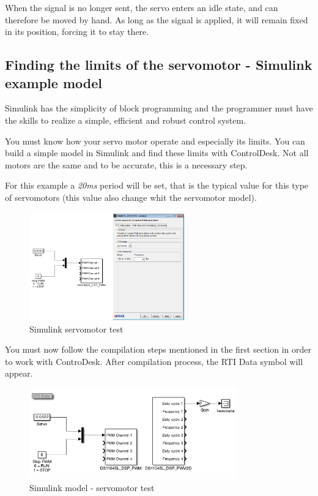 When the signal is no longer sent, the servo enters an idle state, and can therefore be moved by hand. As long as the signal is applied, it will remain fixed in its position, forcing it to stay there.

\subsection{Finding the limits of the servomotor - Simulink example model}

Simulink has the simplicity of block programming and the programmer must have the skills to realize a simple, efficient and robust control system.

You must know how your servo motor operate and especially its limits. You can build a simple model in Simulink and find these limits with ControlDesk. Not all motors are the same and to be accurate, this is a necessary step.

For this example a \textit{20ms} period will be set, that is the typical value for this type of servomotors (this value also change whit the servomotor model).
    \begin{figure}[H]
        \centering
        \includegraphics[width=0.6\textwidth]{Images/Ball and Bean/PWM_Example.png}
        \caption{Simulink servomotor test}
        \label{fig22}
    \end{figure}
You must now follow the compilation steps mentioned in the first section in order to work with ControDesk. After compilation process, the RTI Data symbol will appear.
       
     \begin{figure}[H]
        \centering
        \includegraphics[width=0.8\textwidth]{Images/Ball and Bean/PWMExampleSimulink.png}
        \caption{Simulink model - servomotor test}
        \label{fig37}
    \end{figure}
    
